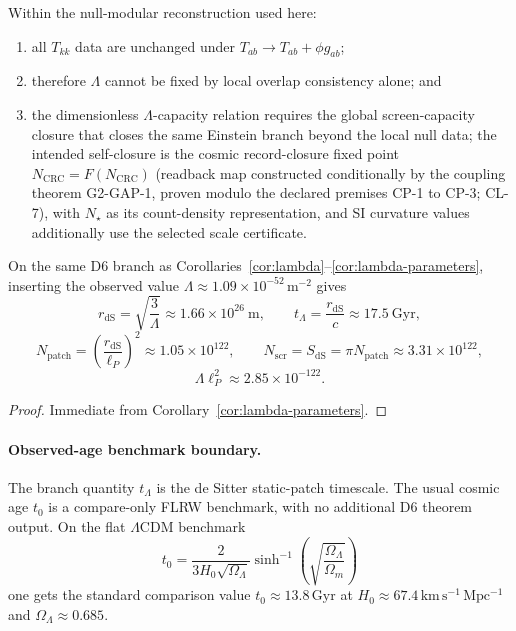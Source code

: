 \begin{theorem}
Within the null-modular reconstruction used here:
\begin{enumerate}[leftmargin=2em]
\item all \(T_{kk}\) data are unchanged under \(T_{ab}\to T_{ab}+\phi g_{ab}\);
\item therefore \(\Lambda\) cannot be fixed by local overlap consistency alone; and
\item the dimensionless \(\Lambda\)-capacity relation requires the global screen-capacity closure that closes the same Einstein branch beyond the local null data; the intended self-closure is the cosmic record-closure fixed point \(N_{\mathrm{CRC}}=F(N_{\mathrm{CRC}})\) (readback map constructed conditionally by the coupling theorem G2-GAP-1, proven modulo the declared premises CP-1 to CP-3; CL-7), with \(N_\star\) as its count-density representation, and SI curvature values additionally use the selected scale certificate.
\end{enumerate}
\end{theorem}

\begin{corollary}\label{cor:lambda-benchmark}
On the same D6 branch as Corollaries~\ref{cor:lambda}--\ref{cor:lambda-parameters}, inserting the observed value \(\Lambda\approx 1.09\times 10^{-52}\,\mathrm{m^{-2}}\) gives
\[
r_{\mathrm{dS}}=\sqrt{\frac{3}{\Lambda}}\approx 1.66\times 10^{26}\ \mathrm{m},
\qquad
t_\Lambda=\frac{r_{\mathrm{dS}}}{c}\approx 17.5\ \mathrm{Gyr},
\]
\[
N_{\mathrm{patch}}=\left(\frac{r_{\mathrm{dS}}}{\ell_P}\right)^2
\approx 1.05\times 10^{122},
\qquad
N_{\mathrm{scr}}=S_{\mathrm{dS}}=\pi N_{\mathrm{patch}}
\approx 3.31\times 10^{122},
\]
\[
\Lambda\ell_P^2\approx 2.85\times10^{-122}.
\]
\end{corollary}

\begin{proof}
Immediate from Corollary~\ref{cor:lambda-parameters}.
\end{proof}

\paragraph{Observed-age benchmark boundary.}
The branch quantity \(t_\Lambda\) is the de Sitter static-patch timescale. The usual cosmic age \(t_0\) is a compare-only FLRW benchmark, with no additional D6 theorem output. On the flat \(\Lambda\)CDM benchmark
\[
t_0=\frac{2}{3H_0\sqrt{\Omega_\Lambda}}
\sinh^{-1}\!\left(\sqrt{\frac{\Omega_\Lambda}{\Omega_m}}\right)
\]
one gets the standard comparison value \(t_0\approx 13.8\,\mathrm{Gyr}\) at
\(H_0\approx 67.4\,\mathrm{km\,s^{-1}\,Mpc^{-1}}\) and \(\Omega_\Lambda\approx 0.685\).

